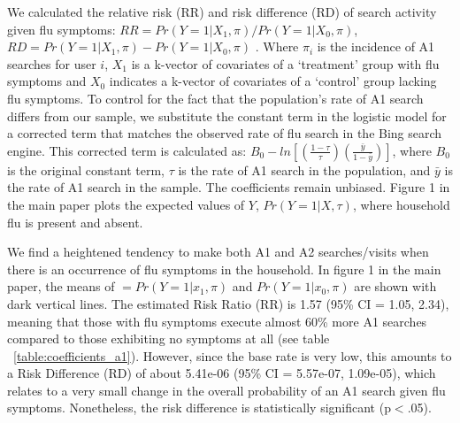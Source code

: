 \documentclass[12pt]{article}
\begin{document}
We calculated the relative risk (RR) and risk difference (RD) of search activity given flu symptoms: $ RR = Pr(Y=1|X_1, \pi) / Pr(Y=1|X_0, \pi) $, $ RD = Pr(Y=1|X_1, \pi) - Pr(Y=1|X_0, \pi) $ \citep{king_and_zeng_2001}. Where $\pi_i$ is the incidence of A1 searches for user $i$, $X_1$ is a k-vector of covariates of a `treatment' group with flu symptoms and $X_0$ indicates a k-vector of covariates of a `control' group lacking flu symptoms. To control for the fact that the population's rate of A1 search differs from our sample, we substitute the constant term in the logistic model for a corrected term that matches the observed rate of flu search in the Bing search engine. This corrected term is calculated as: $B_0 - ln[ (\frac{1-\tau}{\tau}) (\frac{\bar{y}}{1-\bar{y}}) ]$, where $B_0$ is the original constant term, $\tau$ is the rate of A1 search in the population, and $\bar{y}$ is the rate of A1 search in the sample. The coefficients remain unbiased. Figure 1 in the main paper plots the expected values of $Y$, $Pr(Y=1|X, \tau)$, where household flu is present and absent.



We find a heightened tendency to make both A1 and A2  searches/visits when there is an occurrence of flu symptoms in the household. In figure 1 in the main paper, the means of $ = Pr(Y=1|x_1, \pi)$ and $ Pr(Y=1|x_0, \pi) $ are shown with dark vertical lines. The estimated Risk Ratio (RR) is 1.57 (95\% CI = 1.05, 2.34), meaning that those with flu symptoms execute almost 60\% more A1 searches compared to those exhibiting no symptoms at all (see table ~\ref{table:coefficients_a1}). However, since the base rate is very low, this amounts to a Risk Difference (RD) of about 5.41e-06 (95\% CI = 5.57e-07, 1.09e-05), which relates to a very small change in the overall probability of an A1 search given flu symptoms. Nonetheless, the risk difference is statistically significant (p$<$.05). 

\end{document}
